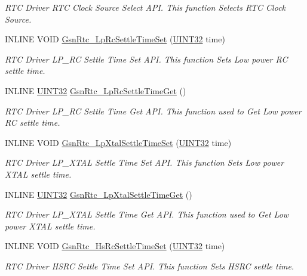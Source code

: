 \begin{DoxyCompactItemize}
\begin{DoxyCompactList}\small\item\em RTC Driver RTC Clock Source Select API. This function Selects RTC Clock Source. \end{DoxyCompactList}\item 
INLINE VOID \hyperlink{a00651_gacd65e7f250f4ff9d765a52cb7a98364d}{GsnRtc\_\-LpRcSettleTimeSet} (\hyperlink{a00660_gae1e6edbbc26d6fbc71a90190d0266018}{UINT32} time)
\begin{DoxyCompactList}\small\item\em RTC Driver LP\_\-RC Settle Time Set API. This function Sets Low power RC settle time. \end{DoxyCompactList}\item 
INLINE \hyperlink{a00660_gae1e6edbbc26d6fbc71a90190d0266018}{UINT32} \hyperlink{a00651_ga6a60c0b7cae76518688a439962271516}{GsnRtc\_\-LpRcSettleTimeGet} ()
\begin{DoxyCompactList}\small\item\em RTC Driver LP\_\-RC Settle Time Get API. This function used to Get Low power RC settle time. \end{DoxyCompactList}\item 
INLINE VOID \hyperlink{a00651_ga538ed2973406041682e66fd8034a0134}{GsnRtc\_\-LpXtalSettleTimeSet} (\hyperlink{a00660_gae1e6edbbc26d6fbc71a90190d0266018}{UINT32} time)
\begin{DoxyCompactList}\small\item\em RTC Driver LP\_\-XTAL Settle Time Set API. This function Sets Low power XTAL settle time. \end{DoxyCompactList}\item 
INLINE \hyperlink{a00660_gae1e6edbbc26d6fbc71a90190d0266018}{UINT32} \hyperlink{a00651_ga1274c4c1efb74b9a17b712f530363ccb}{GsnRtc\_\-LpXtalSettleTimeGet} ()
\begin{DoxyCompactList}\small\item\em RTC Driver LP\_\-XTAL Settle Time Get API. This function used to Get Low power XTAL settle time. \end{DoxyCompactList}\item 
INLINE VOID \hyperlink{a00651_ga1357f8d86bead303212bbbb6b8eb2e93}{GsnRtc\_\-HsRcSettleTimeSet} (\hyperlink{a00660_gae1e6edbbc26d6fbc71a90190d0266018}{UINT32} time)
\begin{DoxyCompactList}\small\item\em RTC Driver HSRC Settle Time Set API. This function Sets HSRC settle time. \end{DoxyCompactList}\item 

\end{DoxyCompactItemize}
